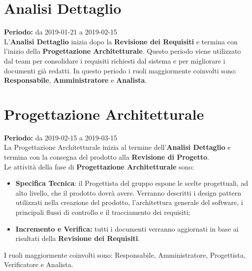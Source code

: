 \section{Analisi Dettaglio}
\textbf{Periodo:} da 2019-01-21 a 2019-02-15\\
L'\textbf{Analisi Dettaglio} inizia dopo la \textbf{Revisione dei Requisiti} e termina con l’inizio della \textbf{Progettazione Architetturale}. Questo periodo viene utilizzato dal team per consolidare i requisiti richiesti dal sistema e per migliorare i documenti già redatti. In questo periodo i ruoli maggiormente coinvolti sono: \textbf{Responsabile}, \textbf{Amministratore} e \textbf{Analista}.

\section{Progettazione Architetturale}
\textbf{Periodo:} da 2019-02-15 a 2019-03-15\\
La Progettazione Architetturale inizia al termine dell’\textbf{Analisi Dettaglio} e termina con la consegna del prodotto alla \textbf{Revisione di Progetto}.\\
Le attività della fase di \textbf{Progettazione Architetturale} sono:
\begin{itemize}
    \item \textbf{Specifica Tecnica}: il Progettista del gruppo espone le scelte progettuali, ad alto livello, che il prodotto dovrà avere. Verranno descritti i design pattern utilizzati nella creazione del prodotto, l’architettura generale del software, i principali flussi di controllo e il tracciamento dei requisiti;
    \item \textbf{Incremento e Verifica:} tutti i documenti verranno aggiornati in base ai risultati della \textbf{Revisione dei Requisiti}. 
\end{itemize}
I ruoli maggiormente coinvolti sono: Responsabile, Amministratore, Progettista, Verificatore e Analista.

